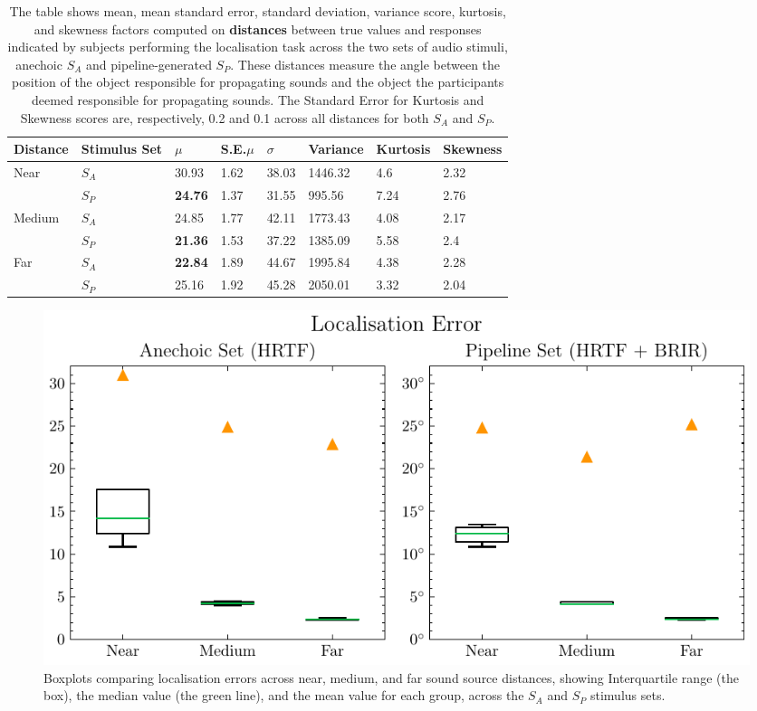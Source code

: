 \begin{table}[htbp]
\centering
\begin{tabular}{@{}llllllll@{}}
\toprule
Distance                & Stimulus Set & $\mu$   & S.E.$\mu$ & $\sigma$ & Variance & Kurtosis & Skewness    \\ \midrule
\multirow{2}{*}{Near}   & $S_A$ & 30.93          & 1.62      & 38.03   & 1446.32  & 4.6        & 2.32       \\
                        & $S_P$ & \textbf{24.76} & 1.37      & 31.55   & 995.56   & 7.24       & 2.76       \\
\multirow{2}{*}{Medium} & $S_A$ & 24.85          & 1.77      & 42.11   & 1773.43  & 4.08       & 2.17       \\
                        & $S_P$ & \textbf{21.36} & 1.53      & 37.22   & 1385.09  & 5.58       & 2.4        \\
\multirow{2}{*}{Far}    & $S_A$ & \textbf{22.84} & 1.89      & 44.67   & 1995.84  & 4.38       & 2.28       \\
                        & $S_P$ & 25.16          & 1.92      & 45.28   & 2050.01  & 3.32       & 2.04       \\ \bottomrule
\end{tabular}
\caption{The table shows mean, mean standard error, standard deviation, variance score, kurtosis, and skewness factors computed on \textbf{distances} between true values and responses indicated by subjects performing the localisation task across the two sets of audio stimuli, anechoic $S_A$ and pipeline-generated $S_P$. These distances measure the angle between the position of the object responsible for propagating sounds and the object the participants deemed responsible for propagating sounds. The Standard Error for Kurtosis and Skewness scores are, respectively, 0.2 and 0.1 across all distances for both $S_A$ and $S_P$.}
\label{tab:loc-error-groups}
\end{table}

\begin{figure}[htbp]
    \centering
    \includegraphics[width=1\linewidth]{7_evaluation/images/localisation_accuracy.pdf}
    \caption{Boxplots comparing localisation errors across near, medium, and far sound source distances, showing Interquartile range (the box), the median value (the green line), and the mean value for each group, across the $S_A$ and $S_P$ stimulus sets.}
    \label{fig:localisation-acc}
\end{figure}

